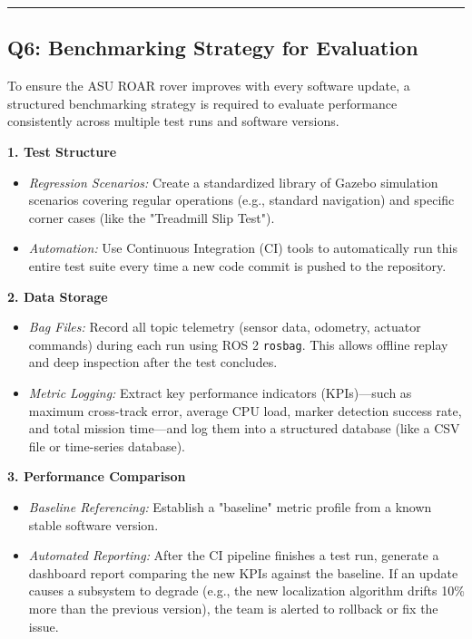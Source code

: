 \documentclass[12pt,a4paper]{article}
\begin{document}
\vspace{0.3em}
\noindent\rule{\textwidth}{0.4pt}
\vspace{0.3em}


\subsection{Q6: Benchmarking Strategy for Evaluation}

To ensure the ASU ROAR rover improves with every software update, a structured benchmarking strategy is required to evaluate performance consistently across multiple test runs and software versions.

\noindent\textbf{1. Test Structure}
\begin{itemize}[leftmargin=*]
    \item \textit{Regression Scenarios:} Create a standardized library of Gazebo simulation scenarios covering regular operations (e.g., standard navigation) and specific corner cases (like the "Treadmill Slip Test").
    \item \textit{Automation:} Use Continuous Integration (CI) tools to automatically run this entire test suite every time a new code commit is pushed to the repository.
\end{itemize}

\noindent\textbf{2. Data Storage}
\begin{itemize}[leftmargin=*]
    \item \textit{Bag Files:} Record all topic telemetry (sensor data, odometry, actuator commands) during each run using ROS 2 \texttt{rosbag}. This allows offline replay and deep inspection after the test concludes.
    \item \textit{Metric Logging:} Extract key performance indicators (KPIs)---such as maximum cross-track error, average CPU load, marker detection success rate, and total mission time---and log them into a structured database (like a CSV file or time-series database).
\end{itemize}

\noindent\textbf{3. Performance Comparison}
\begin{itemize}[leftmargin=*]
    \item \textit{Baseline Referencing:} Establish a "baseline" metric profile from a known stable software version.
    \item \textit{Automated Reporting:} After the CI pipeline finishes a test run, generate a dashboard report comparing the new KPIs against the baseline. If an update causes a subsystem to degrade (e.g., the new localization algorithm drifts 10\% more than the previous version), the team is alerted to rollback or fix the issue.
\end{itemize}
\end{document}
